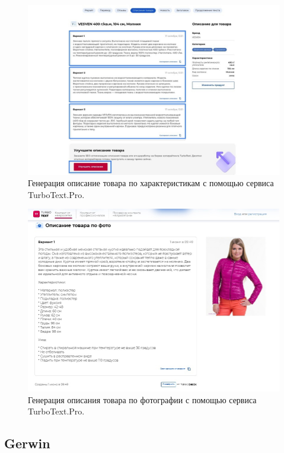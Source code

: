 \documentclass[a4paper,12pt]{extarticle}
\begin{document}
\begin{figure}[ht]
	\centering
	\includegraphics[scale=0.4]{turbotextpro.png}
	\caption{Генерация описание товара по характеристикам с помощью сервиса TurboText.Pro.}
	\label{fig:turbotextpro}
\end{figure}

\begin{figure}[ht]
	\centering
	\includegraphics[scale=0.4]{turbotext-photo.png}
	\caption{Генерация описания товара по фотографии с помощью сервиса TurboText.Pro.}
	\label{fig:turbotext-photo}
\end{figure}

\newpage
\subsection{Gerwin}
\end{document}
